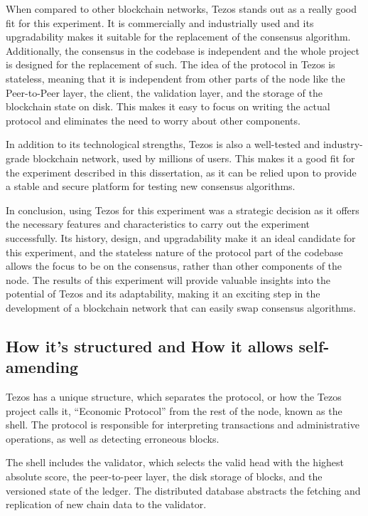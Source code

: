 When compared to other blockchain networks, Tezos stands out as a really good fit for this experiment. It is commercially and industrially used and its upgradability makes it suitable for the replacement of the consensus algorithm. Additionally, the consensus in the codebase is independent and the whole project is designed for the replacement of such. 
The idea of the protocol in Tezos is stateless, meaning that it is independent from other parts of the node like the Peer-to-Peer layer, the client, the validation layer, and the storage of the blockchain state on disk.
This makes it easy to focus on writing the actual protocol and eliminates the need to worry about other components.

In addition to its technological strengths, Tezos is also a well-tested and industry-grade blockchain network, used by millions of users. This makes it a good fit for the experiment described in this dissertation, as it can be relied upon to provide a stable and secure platform for testing new consensus algorithms.


In conclusion, using Tezos for this experiment was a strategic decision as it offers the necessary features and characteristics to carry out the experiment successfully. Its history, design, and upgradability make it an ideal candidate for this experiment, and the stateless nature of the protocol part of the codebase allows the focus to be on the consensus, rather than other components of the node.
The results of this experiment will provide valuable insights into the potential of Tezos and its adaptability, making it an exciting step in the development of a blockchain network that can easily swap consensus algorithms.



\subsection*{How it's structured and How it allows self-amending}

Tezos has a unique structure, which separates the protocol, or how the Tezos project calls it, ``Economic Protocol'' from the rest of the node, known as the shell. 
The protocol is responsible for interpreting transactions and administrative operations, as well as detecting erroneous blocks.

The shell includes the validator, which selects the valid head with the highest absolute score, the peer-to-peer layer, the disk storage of blocks, and the versioned state of the ledger. The distributed database abstracts the fetching and replication of new chain data to the validator.

